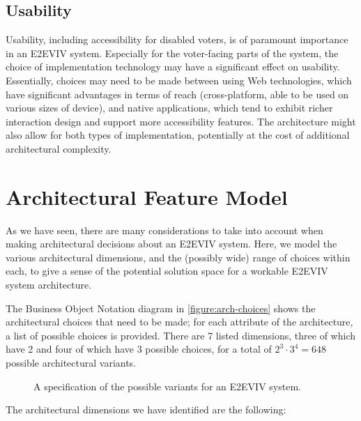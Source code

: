 \subsection{Usability}

Usability, including accessibility for disabled voters, is of
paramount importance in an E2EVIV system. Especially for the
voter-facing parts of the system, the choice of implementation
technology may have a significant effect on usability. Essentially,
choices may need to be made between using Web technologies, which have
significant advantages in terms of reach (cross-platform, able to be
used on various sizes of device), and native applications, which tend
to exhibit richer interaction design and support more accessibility
features. The architecture might also allow for both types of
implementation, potentially at the cost of additional architectural
complexity.

\section{Architectural Feature Model}

As we have seen, there are many considerations to take into account
when making architectural decisions about an E2EVIV system. Here, we
model the various architectural dimensions, and the (possibly wide)
range of choices within each, to give a sense of the potential
solution space for a workable E2EVIV system architecture.

The Business Object Notation diagram in \autoref{figure:arch-choices}
shows the architectural choices that need to be made; for each
attribute of the architecture, a list of possible choices is
provided. There are 7 listed dimensions, three of which have 2 and
four of which have 3 possible choices, for a total of
$2^3\cdot{}3^4=648$ possible architectural variants.

\begin{figure}[t]
\begin{center}

\end{center}
\caption{A specification of the possible variants for an E2EVIV system.}
\label{figure:arch-choices}
\end{figure}

The architectural dimensions we have identified are the following:


